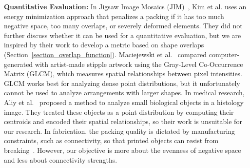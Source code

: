 \newtext
{
\textbf{Quantitative Evaluation:}
In Jigsaw Image Mosaics (JIM)~\cite{Kim2002}, Kim et al. uses an energy minimization approach
that penalizes a packing if it has too much negative space,
too many overlaps, or severely deformed elements. 
They did not further discuss whether it can be used for a quantitative evaluation,
but we are inspired by their work to develop a metric based on shape overlaps (Section~\ref{section_overlap_function}).
Maciejewski et al.~\cite{Maciejewski2008} compared computer-generated 
with artist-made stipple artwork using the Gray-Level Co-Occurrence Matrix (GLCM),
which measures spatial relationships between pixel intensities.
GLCM works best for analyzing dense point distributions, but it unfortunately cannot be used to analyze arrangements with larger shapes.
In medical research, Aliy et al.~\cite{Aliy2013} proposed a method to analyze small biological objects in a histology image.
They treated these objects as a point distribution by computing their centroids and encoded their spatial relationships, 
so their work is unsuitable for our research.
In fabrication, the packing quality is dictated by manufacturing constraints, such as connectivity,
so that printed objects can resist from breaking~\cite{Chen2016, Zehnder2016, Martinez2019}.
However, our objective is more about the evenness of negative space and less about connectivity strengths.
}







